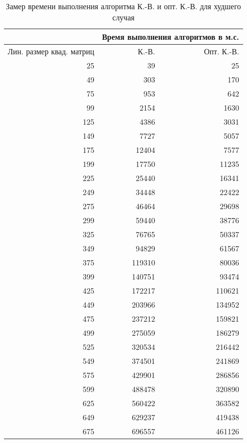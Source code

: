 \begin{table}[h]
	\begin{center}
		\begin{threeparttable}
		\captionsetup{justification=raggedright, singlelinecheck=off}
		\caption{\centering\label{tbl:bad_time}Замер времени выполнения алгоритма К.-В. и опт. К.-В. для худшего случая}
		\begin{tabular}{|r|r|r|}
		\hline
		& \multicolumn{2}{c|}{Время выполнения алгоритмов в м.с.} \\
		\hline
		Лин. размер квад. матриц & К.-В. & Опт. К.-В. \\
		\hline
		25 & 39 & 25 \\
		\hline
		49 & 303 & 170 \\
		\hline
		75 & 953 & 642 \\
		\hline
		99 & 2154 & 1630 \\
		\hline
		125 & 4386 & 3031 \\
		\hline
		149 & 7727 & 5057 \\
		\hline
		175 & 12404 & 7577 \\
		\hline
		199 & 17750 & 11235 \\
		\hline
		225 & 25440 & 16341 \\
		\hline
		249 & 34448 & 22422 \\
		\hline
		275 & 46464 & 29698 \\
		\hline
		299 & 59440 & 38776 \\
		\hline
		325 & 76765 & 50337 \\
		\hline
		349 & 94829 & 61567 \\
		\hline
		375 & 119310 & 80036 \\
		\hline
		399 & 140751 & 93474 \\
		\hline
		425 & 172217 & 110621 \\
		\hline
		449 & 203966 & 134952 \\
		\hline
		475 & 237212 & 159821 \\
		\hline
		499 & 275059 & 186279 \\
		\hline
		525 & 320534 & 216442 \\
		\hline
		549 & 374501 & 241869 \\
		\hline
		575 & 429901 & 286856 \\
		\hline
		599 & 488478 & 320890 \\
		\hline
		625 & 560422 & 363582 \\
		\hline
		649 & 629237 & 419438 \\
		\hline
		675 & 696557 & 461126 \\

\end{tabular}
\end{threeparttable}
\end{center}
\end{table}
